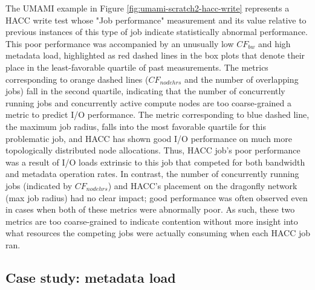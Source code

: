 {The UMAMI example in Figure \ref{fig:umami-scratch2-hacc-write} represents a HACC write test whose "Job performance" measurement and its value relative to previous instances of this type of job indicate statistically abnormal performance.
This poor performance was accompanied by an unusually low $\mathit{CF}_{\mathit{bw}}$ and high metadata load, highlighted as red dashed lines in the box plots that denote their place in the least-favorable quartile of past measurements.
The metrics corresponding to orange dashed lines ($\mathit{CF}_{\mathit{nodehrs}}$ and the number of overlapping jobs) fall in the second quartile, indicating that the number of concurrently running jobs and concurrently active compute nodes are too coarse-grained a metric to predict I/O performance.
The metric corresponding to blue dashed line, the maximum job radius, falls into the most favorable quartile for this problematic job, and HACC has shown good I/O performance on much more topologically distributed node allocations.
Thus, HACC job's poor performance was a result of I/O loads extrinsic to this job that competed for both bandwidth and metadata operation rates.
In contrast, the number of concurrently running jobs (indicated by $\mathit{CF}_{\mathit{nodehrs}}$) and HACC's placement on the dragonfly network (max job radius) had no clear impact; good performance was often observed even in cases when both of these metrics were abnormally poor.
As such, these two metrics are too coarse-grained to indicate contention without more insight into what resources the competing jobs were actually consuming when each HACC job ran.

\subsection{Case study: metadata load}

}
